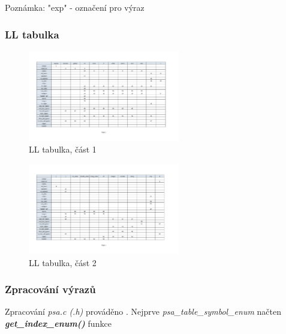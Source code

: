 \documentclass[a4paper, 12pt]{article}
\begin{document}
\vspace{1cm}
Poznámka: "exp" - označení pro výraz

\newpage

\subsubsection{LL tabulka}
\begin{figure}[ht!]
\begin{center}
  \includegraphics[angle=90,origin=c, width=0.59\textwidth, trim={0 2.5cm 0 2.5cm},clip]{images/LL_table_1.pdf}
  \caption{LL tabulka, část 1}
\end{center}
\end{figure}


\newpage

\begin{figure}[ht!]
\begin{center}
  \includegraphics[angle=90,origin=c, width=0.59\textwidth, trim={0 2.5cm 0 2.5cm},clip]{images/LL_table_2.pdf}
  \caption{LL tabulka, část 2}
\end{center}
\end{figure}

\newpage

\subsubsection{Zpracování výrazů}
Zpracování \textit{psa.c (.h)} prováděno \cite{FITPUB8538}. Nejprve \textit{psa\_table\_symbol\_enum} načten \textit{\textbf{get\_index\_enum()}} funkce
\end{document}
